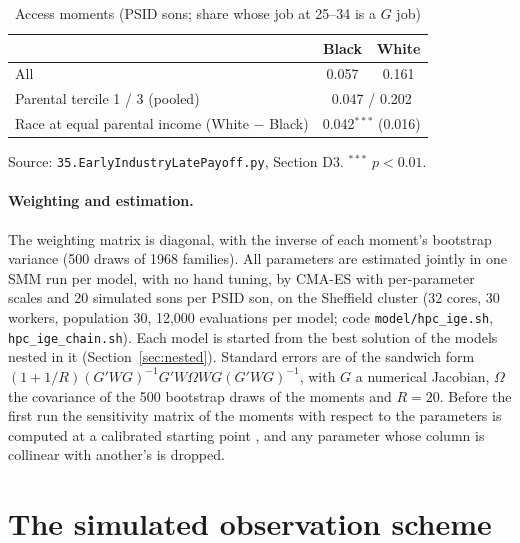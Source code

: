 \documentclass[11pt]{article}
\newcommand{\code}[1]{\texttt{#1}}
\newcommand{\1}{\mathbf{1}}
\begin{document}
\begin{table}[h]
\centering
\caption{Access moments (PSID sons; share whose job at 25--34 is a $G$ job)}\label{tab:accessmom}
\begin{tabular}{lcc}
\toprule
 & Black & White \\
\midrule
All & 0.057 & 0.161 \\
Parental tercile 1 / 3 (pooled) & \multicolumn{2}{c}{0.047 / 0.202} \\
Race at equal parental income (White $-$ Black) & \multicolumn{2}{c}{0.042$^{***}$ (0.016)} \\
\bottomrule
\end{tabular}
\par\smallskip
{\footnotesize Source: \code{35.EarlyIndustryLatePayoff.py}, Section D3. $^{***}$ $p<0.01$.}
\end{table}

\paragraph{Weighting and estimation.} The weighting matrix is diagonal, with the inverse of each moment's bootstrap
variance (500 draws of 1968 families). All parameters are estimated jointly in one SMM run per model, with no hand tuning,
by CMA-ES with per-parameter scales and 20 simulated sons per PSID son, on the Sheffield cluster (32 cores, 30 workers,
population 30, 12,000 evaluations per model; code \code{model/hpc\_ige.sh}, \code{hpc\_ige\_chain.sh}). Each model
is started from the best solution of the models nested in it (Section~\ref{sec:nested}). Standard errors are of the sandwich form $(1 + 1/R)(G'WG)^{-1}G'W\Omega WG(G'WG)^{-1}$, with $G$ a numerical
Jacobian, $\Omega$ the covariance of the 500 bootstrap draws of the moments and $R = 20$. Before the first run the
sensitivity matrix of the moments with respect to the parameters is computed at a calibrated starting point
\citep{andrews2017measuring}, and any parameter whose column is collinear with another's is dropped.

\section{The simulated observation scheme}\label{sec:obs}
\end{document}
